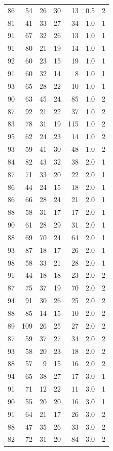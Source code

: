 \documentclass[
  11pt,
  a4paper,
]{scrartcl}
\begin{document}
\begin{longtable}[]{@{}rrrrrrl@{}}
86 & 54 & 26 & 30 & 13 & 0.5 & 2 \\
81 & 41 & 33 & 27 & 34 & 1.0 & 1 \\
91 & 67 & 32 & 26 & 13 & 1.0 & 1 \\
91 & 80 & 21 & 19 & 14 & 1.0 & 1 \\
92 & 60 & 23 & 15 & 19 & 1.0 & 1 \\
91 & 60 & 32 & 14 & 8 & 1.0 & 1 \\
93 & 65 & 28 & 22 & 10 & 1.0 & 1 \\
90 & 63 & 45 & 24 & 85 & 1.0 & 2 \\
87 & 92 & 21 & 22 & 37 & 1.0 & 2 \\
83 & 78 & 31 & 19 & 115 & 1.0 & 2 \\
95 & 62 & 24 & 23 & 14 & 1.0 & 2 \\
93 & 59 & 41 & 30 & 48 & 1.0 & 2 \\
84 & 82 & 43 & 32 & 38 & 2.0 & 1 \\
87 & 71 & 33 & 20 & 22 & 2.0 & 1 \\
86 & 44 & 24 & 15 & 18 & 2.0 & 1 \\
86 & 66 & 28 & 24 & 21 & 2.0 & 1 \\
88 & 58 & 31 & 17 & 17 & 2.0 & 1 \\
90 & 61 & 28 & 29 & 31 & 2.0 & 1 \\
88 & 69 & 70 & 24 & 64 & 2.0 & 1 \\
93 & 87 & 18 & 17 & 26 & 2.0 & 1 \\
98 & 58 & 33 & 21 & 28 & 2.0 & 1 \\
91 & 44 & 18 & 18 & 23 & 2.0 & 2 \\
87 & 75 & 37 & 19 & 70 & 2.0 & 2 \\
94 & 91 & 30 & 26 & 25 & 2.0 & 2 \\
88 & 85 & 14 & 15 & 10 & 2.0 & 2 \\
89 & 109 & 26 & 25 & 27 & 2.0 & 2 \\
87 & 59 & 37 & 27 & 34 & 2.0 & 2 \\
93 & 58 & 20 & 23 & 18 & 2.0 & 2 \\
88 & 57 & 9 & 15 & 16 & 2.0 & 2 \\
94 & 65 & 38 & 27 & 17 & 3.0 & 1 \\
91 & 71 & 12 & 22 & 11 & 3.0 & 1 \\
90 & 55 & 20 & 20 & 16 & 3.0 & 1 \\
91 & 64 & 21 & 17 & 26 & 3.0 & 2 \\
88 & 47 & 35 & 26 & 33 & 3.0 & 2 \\
82 & 72 & 31 & 20 & 84 & 3.0 & 2 \\

\end{longtable}
\end{document}
